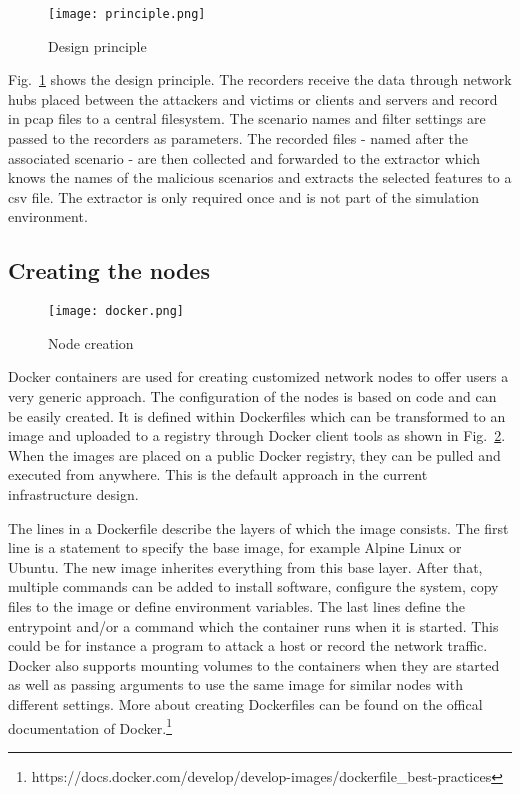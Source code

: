 \documentclass[conference]{IEEEtran}
\begin{document}
\begin{figure}[htbp]
\centerline{\texttt{[image: principle.png]}}
\caption{Design principle}
\label{principle}
\end{figure}

Fig.~\ref{principle} shows the design principle. The recorders receive the data through network hubs placed between the attackers and victims or clients and servers and record in pcap files to a central filesystem. The scenario names and filter settings are passed to the recorders as parameters. The recorded files - named after the associated scenario - are then collected and forwarded to the extractor which knows the names of the malicious scenarios and extracts the selected features to a csv file. The extractor is only required once and is not part of the simulation environment.

\subsection{Creating the nodes}

\begin{figure}[htbp]
\centerline{\texttt{[image: docker.png]}}
\caption{Node creation}
\label{node_creation}
\end{figure}

Docker containers are used for creating customized network nodes to offer users a very generic approach. The configuration of the nodes is based on code and can be easily created. It is defined within Dockerfiles which can be transformed to an image and uploaded to a registry through Docker client tools as shown in Fig.~\ref{node_creation}. When the images are placed on a public Docker registry, they can be pulled and executed from anywhere. This is the default approach in the current infrastructure design. 

The lines in a Dockerfile describe the layers of which the image consists. The first line is a statement to specify the base image, for example Alpine Linux or Ubuntu. The new image inherites everything from this base layer. After that, multiple commands can be added to install software, configure the system, copy files to the image or define environment variables. The last lines define the entrypoint and/or a command which the container runs when it is started. This could be for instance a program to attack a host or record the network traffic. Docker also supports mounting volumes to the containers when they are started as well as passing arguments to use the same image for similar nodes with different settings. More about creating Dockerfiles can be found on the offical documentation of Docker.\footnote{https://docs.docker.com/develop/develop-images/dockerfile\_best-practices} 
\end{document}
